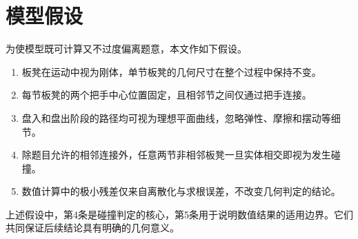 \section{模型假设}
为使模型既可计算又不过度偏离题意，本文作如下假设。

\begin{enumerate}[itemindent=2em]
  \item 板凳在运动中视为刚体，单节板凳的几何尺寸在整个过程中保持不变。
  \item 每节板凳的两个把手中心位置固定，且相邻节之间仅通过把手连接。
  \item 盘入和盘出阶段的路径均可视为理想平面曲线，忽略弹性、摩擦和摆动等细节。
  \item 除题目允许的相邻连接外，任意两节非相邻板凳一旦实体相交即视为发生碰撞。
  \item 数值计算中的极小残差仅来自离散化与求根误差，不改变几何判定的结论。
\end{enumerate}

上述假设中，第4条是碰撞判定的核心，第5条用于说明数值结果的适用边界。它们共同保证后续结论具有明确的几何意义。
